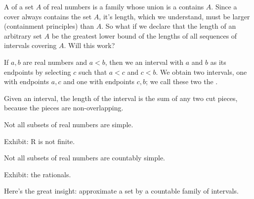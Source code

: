 A 
of a set $A$ of real numbers
is a family whose union
is a contains $A$.
Since a cover always contains
the set $A$, it's length, which
we understand, must be larger
(containment principles) than
$A$.
So what if we declare that
the length of an arbitrary set
$A$ be the greatest lower bound
of the lengths of all sequences
of intervals covering $A$.
Will this work?


If $a, b$ are real numbers and
$a < b$, then we  an interval
with $a$ and $b$ as its endpoints
by selecting $c$ such that
$a < c$ and $c < b$.
We obtain two intervals, one with endpoints
$a,c$ and one with endpoints $c, b$;
we call these two the .

Given an interval, the length of
the interval is the sum of any
two cut pieces, because the pieces
are non-overlapping.




\begin{prop}
  Not all subsets of
  real numbers are simple.

  Exhibit: R is not finite.
\end{prop}


\begin{prop}
  Not all subsets of
  real numbers are countably simple.

  Exhibit: the rationals.
\end{prop}

Here's the great insight:
approximate a set
by a countable family of intervals.


\strats
